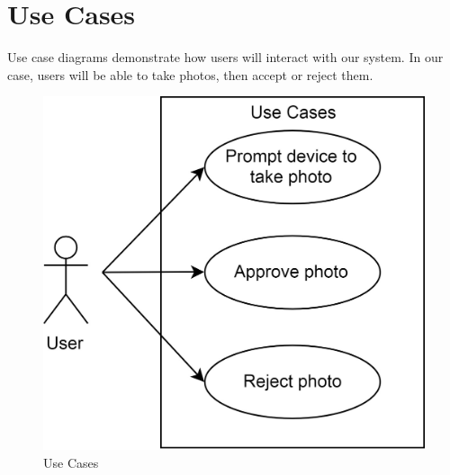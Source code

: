 \chapter{Use Cases}
Use case diagrams demonstrate how users will interact with our system. In our case, users will be able to take photos, then accept or reject them. 

\begin{figure}[!h]
    \centering
    \includegraphics[scale=0.25]{usecasediagram}
    \caption{Use Cases}
    \label{fig:usecasediagram}
\end{figure}

\pagebreak


